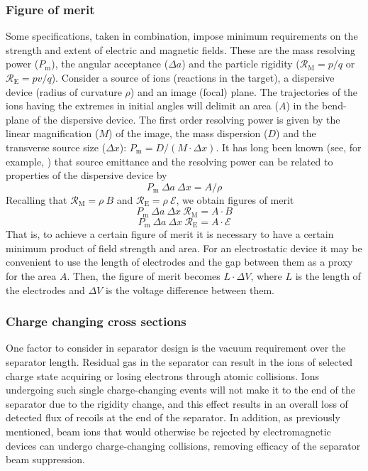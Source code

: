   \subsubsection{Figure of merit}
  Some specifications, taken in combination, impose minimum requirements on the strength and extent of electric and magnetic fields.   These are the mass resolving power ($P_\mathrm{m}$), the angular acceptance ($\Delta a$) and the particle rigidity 
  ($\mathcal{R}_\mathrm{M}=p/q$ or $\mathcal{R}_\mathrm{E}=pv/q$).    
  Consider a source of ions (reactions in the target), a dispersive device  (radius of curvature $\rho$) and an image (focal) plane.   The  trajectories of the ions having the extremes in initial angles will delimit an area ($A$)  in the bend-plane of the dispersive device.     The first order resolving power is given by the linear magnification ($M$) of the image, the mass dispersion ($D$) and the transverse source size ($\Delta x$): 
  $P_\mathrm{m} = D/(M \cdot \Delta x) $. 
  It has long been known (see, for example, \cite{Wo71}) that source emittance and the resolving power can be related to properties of the dispersive device by
  \[ P_\mathrm{m}\  \Delta a\  \Delta x = A/\rho \]
  Recalling that 
  $\mathcal{R}_\mathrm{M}=\rho \ B$ and $\mathcal{R}_\mathrm{E}=\rho \ \mathcal{E}$,  we obtain  figures of merit 
  \[ P_\mathrm{m}\  \Delta a\  \Delta x \ \mathcal{R}_\mathrm{M} = A \cdot B \]
   \[P_\mathrm{m}\  \Delta a\  \Delta x \ \mathcal{R}_\mathrm{E} = A \cdot \mathcal{E} \]
   That is, to achieve a certain figure of merit it is necessary to have a certain minimum product of field strength and area.  For an electrostatic device it may be convenient to use the length of electrodes and the gap between them as a proxy for the area $A$.  Then, the figure of merit becomes $L\cdot\Delta V$, where $L$ is the length of the electrodes and $\Delta V$ is the voltage difference between them.
   
\subsubsection{Charge changing cross sections}
One factor to consider in separator design is the vacuum requirement over the separator length. Residual gas in the separator can result in the ions of selected charge state acquiring or losing electrons through atomic collisions. Ions undergoing such single charge-changing events will not make it to the end of the separator due to the rigidity change, and this effect results in an overall loss of detected flux of recoils at the end of the separator.  In addition, as previously mentioned, beam ions that would otherwise be rejected by electromagnetic devices can undergo charge-changing collisions, removing efficacy of the separator beam suppression.

